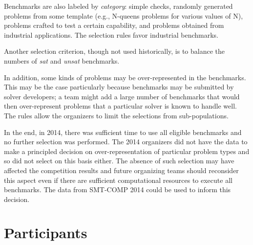 \documentclass[twoside,11pt]{article}
\begin{document}
Benchmarks are also labeled by \emph{category}: simple checks, randomly generated problems from some template (e.g., N-queens problems for various values of N), problems crafted to test a certain capability, and problems obtained from industrial applications. The selection rules favor industrial benchmarks.

Another selection criterion, though not used historically, is to balance the numbers of \textit{sat} and \textit{unsat} benchmarks.

In addition, some kinds of problems may be over-represented in the benchmarks. This may be the case particularly because benchmarks may be submitted by solver developers; a team might add a large number of benchmarks that would then over-represent problems that a particular solver is known to handle well. The rules allow the organizers to limit the selections from sub-populations.

In the end, in 2014, there was sufficient time to use all eligible benchmarks and no further selection was performed. The 2014 organizers did not have the data to make a principled decision on over-representation of particular problem types and so did not select on this basis either. The absence of such selection may have affected the competition results and future organizing teams should reconsider this aspect even if there are sufficient computational resources to execute all benchmarks. The data from SMT-COMP 2014 could be used to inform this decision.



\section{Participants}
\label{sec:participants}
\end{document}
